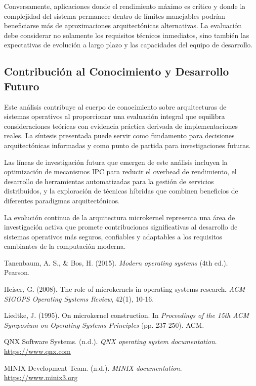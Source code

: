 \documentclass[12pt,a4paper]{article}
\begin{document}
Conversamente, aplicaciones donde el rendimiento máximo es crítico y donde la complejidad del sistema permanece dentro de límites manejables podrían beneficiarse más de aproximaciones arquitectónicas alternativas. La evaluación debe considerar no solamente los requisitos técnicos inmediatos, sino también las expectativas de evolución a largo plazo y las capacidades del equipo de desarrollo.

\subsection{Contribución al Conocimiento y Desarrollo Futuro}

Este análisis contribuye al cuerpo de conocimiento sobre arquitecturas de sistemas operativos al proporcionar una evaluación integral que equilibra consideraciones teóricas con evidencia práctica derivada de implementaciones reales. La síntesis presentada puede servir como fundamento para decisiones arquitectónicas informadas y como punto de partida para investigaciones futuras.

Las líneas de investigación futura que emergen de este análisis incluyen la optimización de mecanismos IPC para reducir el overhead de rendimiento, el desarrollo de herramientas automatizadas para la gestión de servicios distribuidos, y la exploración de técnicas híbridas que combinen beneficios de diferentes paradigmas arquitectónicos.

La evolución continua de la arquitectura microkernel representa una área de investigación activa que promete contribuciones significativas al desarrollo de sistemas operativos más seguros, confiables y adaptables a los requisitos cambiantes de la computación moderna.

\newpage



\begin{thebibliography}{9}

Tanenbaum, A. S., \& Bos, H. (2015). \textit{Modern operating systems} (4th ed.). Pearson.

Heiser, G. (2008). The role of microkernels in operating systems research. \textit{ACM SIGOPS Operating Systems Review}, 42(1), 10-16.

Liedtke, J. (1995). On microkernel construction. In \textit{Proceedings of the 15th ACM Symposium on Operating Systems Principles} (pp. 237-250). ACM.

QNX Software Systems. (n.d.). \textit{QNX operating system documentation}. \url{https://www.qnx.com}

MINIX Development Team. (n.d.). \textit{MINIX documentation}. \url{https://www.minix3.org}

\end{thebibliography}
\end{document}
